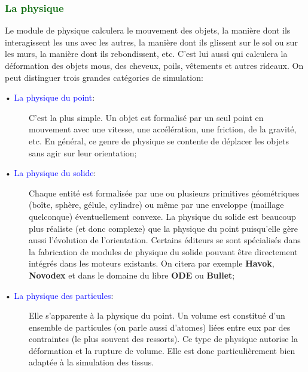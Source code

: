 \documentclass[ebook, 8pt, oneside, openany]{memoir}
\begin{document}
	\subsubsection{\textcolor{darkgreen}{La physique}}
	Le module de physique calculera le mouvement des objets, la manière dont ils interagissent les uns avec 
	les autres, la manière dont ils glissent sur le sol ou sur les murs, la manière dont ils rebondissent, 
	etc. C'est lui aussi qui calculera la déformation des objets mous, des cheveux, poils, vêtements et 
	autres rideaux. On peut distinguer trois grandes catégories de simulation:
	\begin{description}
		\item[• \textcolor{blue}{La physique du point}:] C'est la plus simple. Un objet est formalisé par un
		seul point en mouvement avec une vitesse, une accélération, une friction, de la gravité, etc. En
		général, ce genre de physique se contente de déplacer les objets sans agir sur leur orientation;
		\item[• \textcolor{blue}{La physique du solide}:] Chaque entité est formalisée par une ou plusieurs
		primitives géométriques (boîte, sphère, gélule, cylindre) ou même par une enveloppe (maillage
		quelconque) éventuellement convexe. La physique du solide est beaucoup plus réaliste (et donc
		complexe) que la physique du point puisqu'elle gère aussi l'évolution de l'orientation. Certains
		éditeurs se sont spécialisés dans la fabrication de modules de physique du solide pouvant être
		directement intégrés dans les moteurs existants. On citera par exemple \textbf{Havok},
		\textbf{Novodex} et dans le domaine du libre \textbf{ODE} ou \textbf{Bullet};
		\item[• \textcolor{blue}{La physique des particules}:] Elle s'apparente à la physique du point. Un
		volume est constitué d'un ensemble de particules (on parle aussi d'atomes) liées entre eux par des
		contraintes (le plus souvent des ressorts). Ce type de physique autorise la déformation et la
		rupture de volume. Elle est donc particulièrement bien adaptée à la simulation des tissus.
	\end{description}
\end{document}
